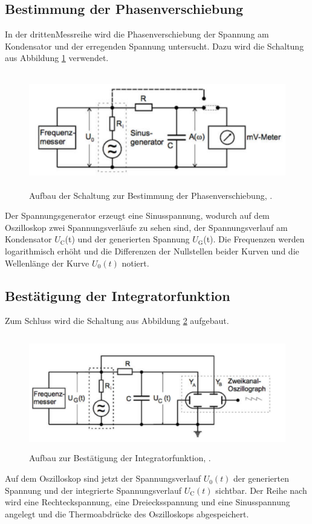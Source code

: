 \subsection{Bestimmung der Phasenverschiebung}
In der drittenMessreihe wird die Phasenverschiebung der Spannung am Kondensator und der erregenden Spannung untersucht. Dazu wird die Schaltung aus Abbildung \ref{fig:c} verwendet.
\begin{figure}[H]
  \centering
  \includegraphics[height=5cm]{Grafiken/c.pdf}
  \caption{Aufbau der Schaltung zur Bestimmung der Phasenverschiebung, \cite{1}.}
  \label{fig:c}
\end{figure}
Der Spannungsgenerator erzeugt eine Sinusspannung, wodurch auf dem Oszilloskop zwei Spannungsverläufe zu sehen sind, der Spannungsverlauf am Kondensator $U_\text{C}$(t) und der generierten Spannung $U_\text{G}$(t). Die Frequenzen werden logarithmisch erhöht und die Differenzen der Nullstellen beider Kurven und die Wellenlänge der Kurve $U_0(t)$ notiert.

\subsection{Bestätigung der Integratorfunktion}
Zum Schluss wird die Schaltung aus Abbildung \ref{fig:d} aufgebaut. 
\begin{figure}[H]
  \centering
  \includegraphics[height=5cm]{Grafiken/d.pdf}
  \caption{Aufbau zur Bestätigung der Integratorfunktion, \cite{1}.}
  \label{fig:d}
\end{figure}
Auf dem Oszilloskop sind jetzt der Spannungsverlauf $U_0(t)$ der generierten Spannung und der integrierte Spannungsverlauf $U_\text{C}(t)$ sichtbar. 
Der Reihe nach wird eine Rechteckspannung, eine Dreiecksspannung und eine Sinusspannung angelegt und die Thermoabdrücke des Oszilloskops abgespeichert. 